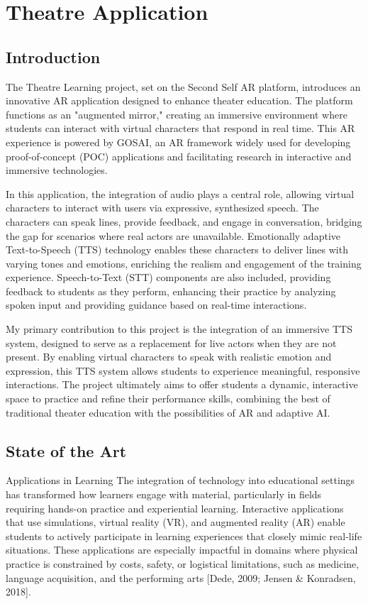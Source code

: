 \section{Theatre Application}

\subsection{Introduction}

The Theatre Learning project, set on the Second Self AR platform, introduces an innovative AR application designed to enhance theater education. The platform functions as an "augmented mirror," creating an immersive environment where students can interact with virtual characters that respond in real time. This AR experience is powered by GOSAI, an AR framework widely used for developing proof-of-concept (POC) applications and facilitating research in interactive and immersive technologies.

In this application, the integration of audio plays a central role, allowing virtual characters to interact with users via expressive, synthesized speech. The characters can speak lines, provide feedback, and engage in conversation, bridging the gap for scenarios where real actors are unavailable. Emotionally adaptive Text-to-Speech (TTS) technology enables these characters to deliver lines with varying tones and emotions, enriching the realism and engagement of the training experience. Speech-to-Text (STT) components are also included, providing feedback to students as they perform, enhancing their practice by analyzing spoken input and providing guidance based on real-time interactions.

My primary contribution to this project is the integration of an immersive TTS system, designed to serve as a replacement for live actors when they are not present. By enabling virtual characters to speak with realistic emotion and expression, this TTS system allows students to experience meaningful, responsive interactions. The project ultimately aims to offer students a dynamic, interactive space to practice and refine their performance skills, combining the best of traditional theater education with the possibilities of AR and adaptive AI.

\subsection{State of the Art}
Applications in Learning
The integration of technology into educational settings has transformed how learners engage with material, particularly in fields requiring hands-on practice and experiential learning. Interactive applications that use simulations, virtual reality (VR), and augmented reality (AR) enable students to actively participate in learning experiences that closely mimic real-life situations. These applications are especially impactful in domains where physical practice is constrained by costs, safety, or logistical limitations, such as medicine, language acquisition, and the performing arts [Dede, 2009; Jensen & Konradsen, 2018].


